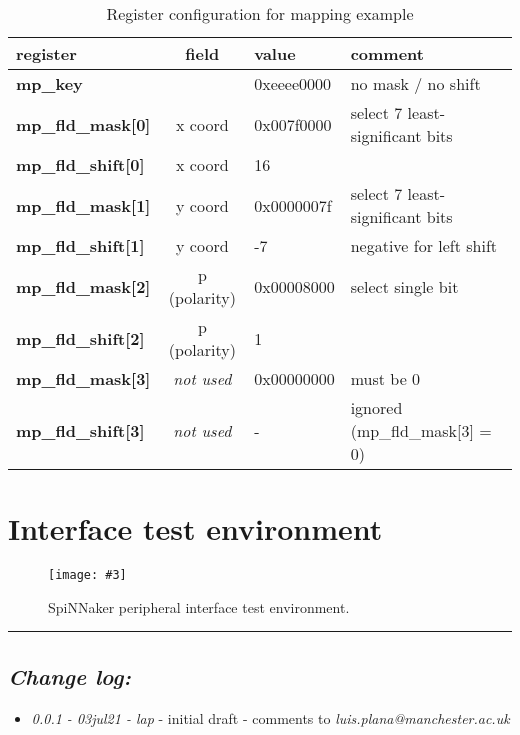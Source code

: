 \documentclass[11pt,a4paper,twoside]{article}
\newcommand{\image}[5][]
{
\begin{figure}[#2]
   \begin{center}
      \texttt{[image: \#3]}
      \caption{#5}
      \label{fig:#4}
   \end{center}
\end{figure}
}
\begin{document}
\begin{table}[!ht]
	\begin{center}
		\begin{tabular}{| l c l l |}
			\hline
			\textbf{register} & \textbf{field} & \textbf{value} & \textbf{comment}  \\%
			\hline
			\hline
			\textbf{mp\_key}           & \cellcolor{green!50}              & 0xeeee0000 & no mask / no shift              \\%
			\textbf{mp\_fld\_mask[0]}  & \cellcolor{brown!85}x coord       & 0x007f0000 & select 7 least-significant bits \\%
			\textbf{mp\_fld\_shift[0]} & \cellcolor{brown!85}x coord       & 16         &                                 \\%
			\textbf{mp\_fld\_mask[1]}  & \cellcolor{violet!50}y coord      & 0x0000007f & select 7 least-significant bits \\%
			\textbf{mp\_fld\_shift[1]} & \cellcolor{violet!50}y coord      & -7         & negative for left shift         \\%
			\textbf{mp\_fld\_mask[2]}  & \cellcolor{yellow!50}p (polarity) & 0x00008000 & select single bit               \\%
			\textbf{mp\_fld\_shift[2]} & \cellcolor{yellow!50}p (polarity) & 1          &                                 \\%
			\textbf{mp\_fld\_mask[3]}  & \textit{not used}                 & 0x00000000 & must be 0                       \\%
			\textbf{mp\_fld\_shift[3]} & \textit{not used}                 & -          & ignored (mp\_fld\_mask[3] = 0)  \\%
			\hline
		\end{tabular}
		\caption{Register configuration for mapping example}
	\end{center}
	\label{tab:map_regs}
\end{table}


\clearpage
\section{Interface test environment}


\image[width = 0.8 \textwidth]{!h}{spif_test_env}{fig:spif_test}
{SpiNNaker peripheral interface test environment.}


\vspace*{1.0cm}
\rule{\linewidth}{2pt}


\subsection*{\itshape Change log:}


\begin{itemize}
	\item {\itshape 0.0.1 - 03jul21 - lap} - initial draft - comments to
	{\itshape luis.plana@manchester.ac.uk}
\end{itemize}
\end{document}
